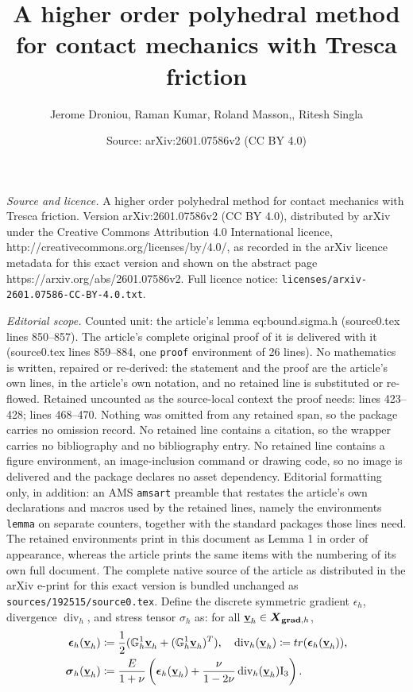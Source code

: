 \documentclass[10pt,a4paper]{amsart}
\title{A higher order polyhedral method for contact mechanics with Tresca friction}
\author{Jerome Droniou, Raman Kumar, Roland Masson,, Ritesh Singla}
\date{Source: arXiv:2601.07586v2 (CC BY 4.0)}
\newcommand{\DIV}{\operatorname{\mathrm{div}}}
\newcommand{\Id}{\mathrm{I}_3}
\def\be{\boldsymbol{\epsilon}}
\def\bsig{\boldsymbol{\sigma}}
\newcommand{\dgr}[1]{\mathbb G^1_{#1}}
\def\dgs{\boldsymbol{X}_{{\bf grad},h}}
\def\tr{{\rm {tr}}}
\newcommand{\uvec}[1]{\underline{\mathbf{#1}}}
\begin{document}
\maketitle

\noindent\emph{Source and licence.} A higher order polyhedral method for contact mechanics with Tresca friction. Version arXiv:2601.07586v2 (CC BY 4.0), distributed by arXiv under the Creative Commons Attribution 4.0 International licence, http://creativecommons.org/licenses/by/4.0/, as recorded in the arXiv licence metadata for this exact version and shown on the abstract page https://arxiv.org/abs/2601.07586v2. Full licence notice: \texttt{licenses/arxiv-2601.07586-CC-BY-4.0.txt}.\par\smallskip

\noindent\textit{Editorial scope.} Counted unit: the article's lemma eq:bound.sigma.h (source0.tex lines 850--857). The article's complete original proof of it is delivered with it (source0.tex lines 859--884, one \texttt{proof} environment of 26 lines). No mathematics is written, repaired or re-derived: the statement and the proof are the article's own lines, in the article's own notation, and no retained line is substituted or re-flowed.  Retained uncounted as the source-local context the proof needs: lines 423--428; lines 468--470.  Nothing was omitted from any retained span, so the package carries no omission record.  No retained line contains a citation, so the wrapper carries no bibliography and no bibliography entry.  No retained line contains a figure environment, an image-inclusion command or drawing code, so no image is delivered and the package declares no asset dependency.  Editorial formatting only, in addition: an AMS \texttt{amsart} preamble that restates the article's own declarations and macros used by the retained lines, namely the environments \texttt{lemma} on separate counters, together with the standard packages those lines need.  The retained environments print in this document as Lemma 1 in order of appearance, whereas the article prints the same items with the numbering of its own full document.  The complete native source of the article as distributed in the arXiv e-print for this exact version is bundled unchanged as \texttt{sources/192515/source0.tex}.
Define the discrete symmetric gradient $\epsilon_h$, divergence $\DIV_h$, and stress tensor $\sigma_h$ as: for all $\uvec{v}_h\in\dgs$,
\begin{alignat}{2}
\be_h(\uvec{v}_h)&\coloneqq\frac{1}{2}(\dgr{h}\uvec{v}_h+(\dgr{h}\uvec{v}_h)^T),\quad\DIV_h(\uvec{v}_h)\coloneqq \tr(\be_h(\uvec{v}_h)),\nonumber\\
 \bsig_h(\uvec{v}_h)&\coloneqq \frac{E}{1+\nu}\left(\be_h(\uvec{v}_h)+\frac{\nu}{1-2\nu} \DIV_h(\uvec{v}_h)\Id\right).
 \label{eq:def.sigma.h}
\end{alignat}
\end{document}
